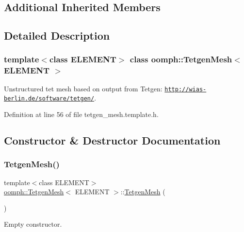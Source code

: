 \subsection*{Additional Inherited Members}


\subsection{Detailed Description}
\subsubsection*{template$<$class E\+L\+E\+M\+E\+NT$>$\newline
class oomph\+::\+Tetgen\+Mesh$<$ E\+L\+E\+M\+E\+N\+T $>$}

Unstructured tet mesh based on output from Tetgen\+: \href{http://wias-berlin.de/software/tetgen/}{\tt http\+://wias-\/berlin.\+de/software/tetgen/}. 

Definition at line 56 of file tetgen\+\_\+mesh.\+template.\+h.



\subsection{Constructor \& Destructor Documentation}
\mbox{\label{classoomph_1_1TetgenMesh_a2d2c7796e578f9fed1faf17569893531}} 
\subsubsection{\texorpdfstring{Tetgen\+Mesh()}{TetgenMesh()}\hspace{0.1cm}{\footnotesize\ttfamily [1/6]}}
{\footnotesize\ttfamily template$<$class E\+L\+E\+M\+E\+NT$>$ \\
\hyperlink{classoomph_1_1TetgenMesh}{oomph\+::\+Tetgen\+Mesh}$<$ E\+L\+E\+M\+E\+NT $>$\+::\hyperlink{classoomph_1_1TetgenMesh}{Tetgen\+Mesh} (\begin{DoxyParamCaption}{ }\end{DoxyParamCaption})\hspace{0.3cm}{\ttfamily [inline]}}



Empty constructor. 



